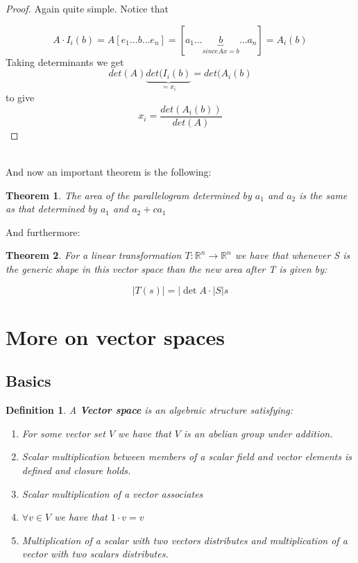 \documentclass[titlepage]{article}
\newtheorem{thm}{Theorem}[subsection]
\newtheorem{definition}{Definition}[subsection]
\numberwithin{equation}{subsection}
\newcommand{\Rn}{\mathbb{R}^n}
\begin{document}
\begin{proof}
Again quite simple. Notice that 

$$A\cdot I_{i}(b) = A[e_{1} \ldots b \dots e_{n}] = [a_{1} \ldots \underbrace{b}_{since Ax = b} \ldots a_{n}] = A_{i}(b)$$
Taking determinants we get $$det(A)\underbrace{det(I_{i}(b)}_{=x_{i}} = det(A_{i}(b)$$ to give $$ x_{i} = \frac{det(A_{i}(b))}{det(A)}$$
\end{proof}
\\
And now an important theorem is the following:

\begin{thm}
The area of the parallelogram determined by $a_{1}$ and $a_{2}$ is the same as that determined by $a_{1}$ and $a_{2} + ca_{1}$
\end{thm}

And furthermore:

\begin{thm}
For a linear transformation $T: \Rn \to  \Rn$ we have that whenever S is the generic shape in this vector space than the new area after T is given by:

$$ |T(s)| = |\det{A} \cdot |S|s$$
\end{thm}

\clearpage

\section{More on vector spaces}
\subsection{Basics}

\begin{tcolorbox}
\begin{definition}
A \textbf{Vector space} is an algebraic structure satisfying:

\begin{enumerate}
    \item For some vector set $V$ we have that $V$ is an abelian group under addition.
    \item Scalar multiplication between members of a scalar field and vector elements is defined and closure holds.
    \item Scalar multiplication of a vector associates
    \item $\forall v \in V$ we have that $1\cdot v = v$
    \item Multiplication of a scalar with two vectors distributes and multiplication of a vector with two scalars distributes. 
\end{enumerate}
\end{definition}
\end{tcolorbox}
\end{document}
